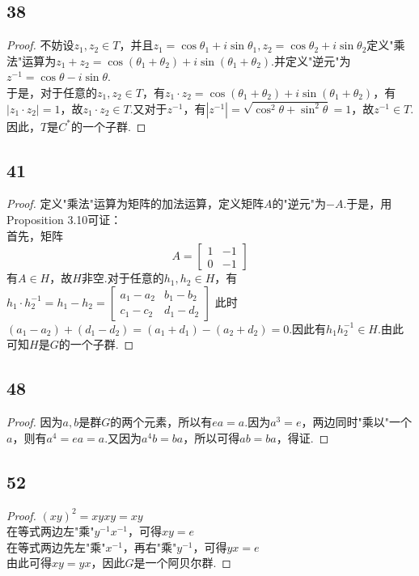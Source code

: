 \documentclass[twocolumn]{article}
\newenvironment{SChinese}{
	\CJKfamily{gbsn}
	\CJKtilde
	\CJKnospace}{}
\begin{document}
\begin{CJK}{UTF8}{}
\begin{SChinese}
				\subsection*{38}
					\begin{proof}
						不妨设$z_1,z_2\in T$，并且$z_1=\cos\theta_1+i\sin\theta_1,z_2=\cos\theta_2+i\sin\theta_2$定义"乘法"运算为$z_1+z_2=\cos(\theta_1+\theta_2)+i\sin(\theta_1+\theta_2)$.并定义"逆元"为$z^{-1}=\cos\theta-i\sin\theta$.\\
						于是，对于任意的$z_1,z_2\in T$，有$z_1\cdot z_2=\cos(\theta_1+\theta_2)+i\sin(\theta_1+\theta_2)$，有$|z_1\cdot z_2|=1$，故$z_1\cdot z_2\in T$.又对于$z^{-1}$，有$|z^{-1}|=\sqrt{\cos^2\theta+\sin^2\theta}=1$，故$z^{-1}\in T$.\\
						因此，$T$是$C^*$的一个子群.
					\end{proof}
				\subsection*{41}
					\begin{proof}
						定义"乘法"运算为矩阵的加法运算，定义矩阵$A$的"逆元"为$-A$.于是，用Proposition 3.10可证：\\
						首先，矩阵\begin{displaymath}
							A=\left [\begin{matrix}
							1 & -1 \\
							0 & -1   
							\end{matrix}\right]
						\end{displaymath}
						有$A\in H$，故$H$非空.对于任意的$h_1,h_2\in H$，有$h_1\cdot h_2^{-1}=h_1-h_2=\left [\begin{matrix}
						a_1-a_2 & b_1-b_2 \\
						c_1-c_2 & d_1-d_2   
						\end{matrix}\right]
						$ 此时$(a_1-a_2)+(d_1-d_2)=(a_1+d_1)-(a_2+d_2)=0$.因此有$h_1h_2^{-1}\in H$.由此可知$H$是$G$的一个子群.
					\end{proof}
				\subsection*{48}
					\begin{proof}
						因为$a,b$是群$G$的两个元素，所以有$ea=a$.因为$a^3=e$，两边同时"乘以"一个$a$，则有$a^4=ea=a$.又因为$a^4b=ba$，所以可得$ab=ba$，得证.
					\end{proof}
				\subsection*{52}
					\begin{proof}
						$(xy)^2=xyxy=xy$\\
						在等式两边左"乘"$y^{-1}x^{-1}$，可得$xy=e$ \\
						在等式两边先左"乘"$x^{-1}$，再右"乘"$y^{-1}$，可得$yx=e$\\
						由此可得$xy=yx$，因此$G$是一个阿贝尔群.
					\end{proof}

\end{SChinese}
\end{CJK}
\end{document}
